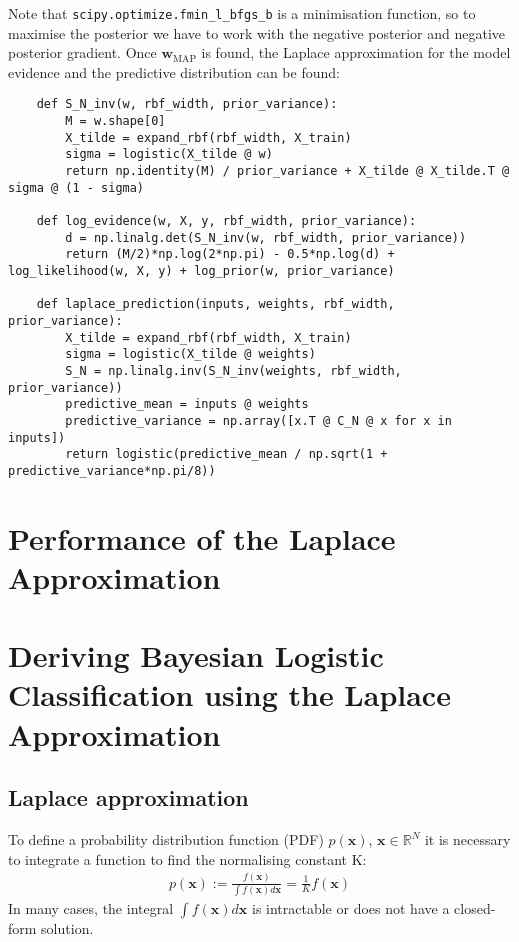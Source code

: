 \documentclass[a4paper]{article}
\begin{document}
    Note that \verb`scipy.optimize.fmin_l_bfgs_b` is a minimisation function, so to maximise the posterior we have to work with the negative posterior and negative posterior gradient.
    Once $\bm{w}_{\text{MAP}}$ is found, the Laplace approximation for the model evidence and the predictive distribution can be found:
    \begin{verbatim}
    def S_N_inv(w, rbf_width, prior_variance):
        M = w.shape[0]
        X_tilde = expand_rbf(rbf_width, X_train)
        sigma = logistic(X_tilde @ w)
        return np.identity(M) / prior_variance + X_tilde @ X_tilde.T @ sigma @ (1 - sigma)

    def log_evidence(w, X, y, rbf_width, prior_variance):
        d = np.linalg.det(S_N_inv(w, rbf_width, prior_variance))
        return (M/2)*np.log(2*np.pi) - 0.5*np.log(d) + log_likelihood(w, X, y) + log_prior(w, prior_variance)

    def laplace_prediction(inputs, weights, rbf_width, prior_variance):
        X_tilde = expand_rbf(rbf_width, X_train)
        sigma = logistic(X_tilde @ weights)
        S_N = np.linalg.inv(S_N_inv(weights, rbf_width, prior_variance))
        predictive_mean = inputs @ weights
        predictive_variance = np.array([x.T @ C_N @ x for x in inputs])
        return logistic(predictive_mean / np.sqrt(1 + predictive_variance*np.pi/8))
    \end{verbatim}

    \section{Performance of the Laplace Approximation}



    \newpage
    \appendix
    \section{Deriving Bayesian Logistic Classification using the Laplace Approximation}
    \label{app:derivation}

    \subsection{Laplace approximation}\label{sec:laplace-approximation}

    To define a probability distribution function (PDF) $p(\bm{x})$, $\bm{x} \in \mathbb{R}^N$ it is necessary to integrate a function to find the normalising constant K:
    \begin{align}
        p(\bm{x}) := \frac{f(\bm{x})}{\int f(\bm{x}) d\bm{x}} = \frac{1}{K} f(\bm{x})
    \end{align}
    In many cases, the integral $\int f(\bm{x}) d\bm{x}$ is intractable or does not have a closed-form solution.
\end{document}
